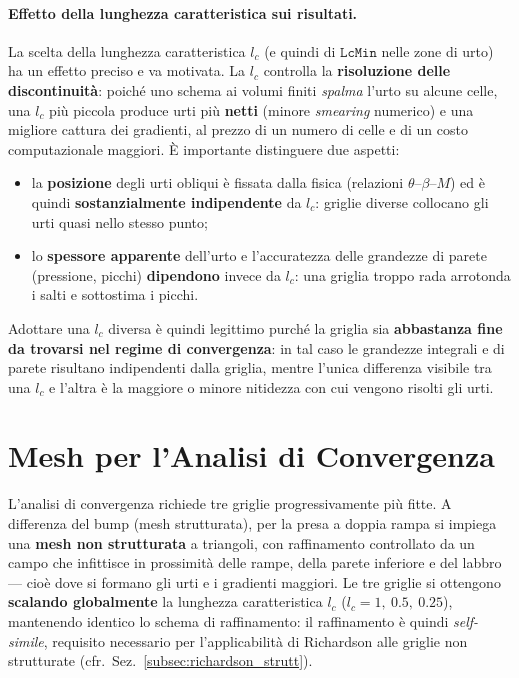 \paragraph{Effetto della lunghezza caratteristica sui risultati.}
La scelta della lunghezza caratteristica $l_c$ (e quindi di $\texttt{LcMin}$ nelle zone di urto)
ha un effetto preciso e va motivata. La $l_c$ controlla la \textbf{risoluzione delle
discontinuità}: poiché uno schema ai volumi finiti \emph{spalma} l'urto su alcune celle, una
$l_c$ più piccola produce urti più \textbf{netti} (minore \emph{smearing} numerico) e una
migliore cattura dei gradienti, al prezzo di un numero di celle e di un costo computazionale
maggiori. È importante distinguere due aspetti:
\begin{itemize}
  \item la \textbf{posizione} degli urti obliqui è fissata dalla fisica (relazioni
    $\theta$--$\beta$--$M$) ed è quindi \textbf{sostanzialmente indipendente} da $l_c$: griglie
    diverse collocano gli urti quasi nello stesso punto;
  \item lo \textbf{spessore apparente} dell'urto e l'accuratezza delle grandezze di parete
    (pressione, picchi) \textbf{dipendono} invece da $l_c$: una griglia troppo rada arrotonda i
    salti e sottostima i picchi.
\end{itemize}
Adottare una $l_c$ diversa è quindi legittimo purché la griglia sia \textbf{abbastanza fine da
trovarsi nel regime di convergenza}: in tal caso le grandezze integrali e di parete risultano
indipendenti dalla griglia, mentre l'unica differenza visibile tra una $l_c$ e l'altra è la
maggiore o minore nitidezza con cui vengono risolti gli urti.

\section{Mesh per l'Analisi di Convergenza}
\label{sec:presa_mesh_conv}

L'analisi di convergenza richiede tre griglie progressivamente più fitte. A differenza del bump
(mesh strutturata), per la presa a doppia rampa si impiega una \textbf{mesh non strutturata} a
triangoli, con raffinamento controllato da un campo che infittisce in prossimità delle rampe,
della parete inferiore e del labbro --- cioè dove si formano gli urti e i gradienti maggiori. Le
tre griglie si ottengono \textbf{scalando globalmente} la lunghezza caratteristica $l_c$
($l_c = 1,\ 0.5,\ 0.25$), mantenendo identico lo schema di raffinamento: il raffinamento è
quindi \emph{self-simile}, requisito necessario per l'applicabilità di Richardson alle griglie non
strutturate (cfr.\ Sez.~\ref{subsec:richardson_strutt}).

